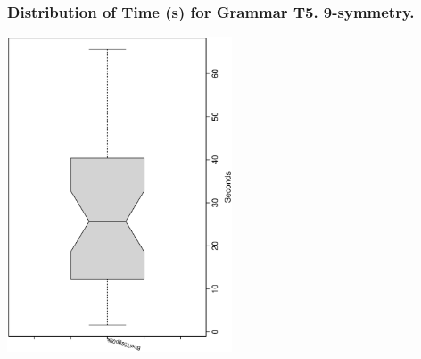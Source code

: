  \begin{frame}
 \frametitle{ Distribution of Time (s) for Grammar T5. 9-symmetry. }
 \begin{center}
\includegraphics[width=0.5\textwidth, angle=-90]
{ExpFboxplottSeconds007.eps}
 \end{center}
 \label{ExpFboxplottSeconds007.eps}  
 \end{frame}

